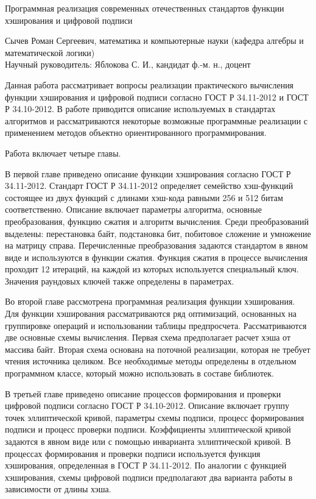 {\Large Программная реализация современных отечественных стандартов функции хэширования и цифровой подписи
\par}
{\large 
	Сычев Роман Сергеевич, математика  и компьютерные науки (кафедра алгебры и математической логики)\\
	Научный руководитель: Яблокова С. И., кандидат ф.-м. н., доцент
\par}
Данная работа рассматривает вопросы реализации практического вычисления функции хэширования и цифровой подписи согласно ГОСТ Р 34.11-2012 и ГОСТ Р 34.10-2012. В работе приводится описание используемых в стандартах алгоритмов и рассматриваются некоторые возможные программные реализации с применением методов объектно ориентированного программирования.
\par
Работа включает четыре главы. 
\par
В первой главе приведено описание функции хэширования согласно ГОСТ Р 34.11-2012. Стандарт ГОСТ Р 34.11-2012 определяет семейство хэш-функций состоящее из двух функций с длинами хэш-кода равными 256 и 512 битам соответственно. Описание включает параметры алгоритма, основные преобразования, функцию сжатия и алгоритм вычисления. Среди преобразований выделены: перестановка байт, подстановка бит, побитовое сложение и умножение на матрицу справа. Перечисленные преобразования задаются стандартом в явном виде и используются в функции сжатия. Функция сжатия в процессе вычисления проходит 12 итераций, на каждой из которых используется специальный ключ. Значения раундовых ключей также определены в параметрах.
\par
Во второй главе рассмотрена программная реализация функции хэширования. Для функции хэширования рассматриваются ряд оптимизаций, основанных на группировке операций и использовании таблицы предпросчета. Рассматриваются две основные схемы вычисления. Первая схема предполагает расчет хэша от массива байт. Вторая схема основана на поточной реализации, которая не требует чтения источника целиком. Все необходимые методы определены в отдельном программном классе, который можно использовать в составе библиотек.
\par
В третьей главе приведено описание процессов формирования и проверки цифровой подписи согласно ГОСТ Р 34.10-2012. Описание включает группу точек эллиптической кривой, параметры схемы подписи, процесс формирования подписи и процесс проверки подписи. Коэффициенты эллиптической кривой задаются в явном виде или с помощью инварианта эллиптической кривой. В процессах формирования и проверки подписи используется функция хэширования, определенная в ГОСТ Р 34.11-2012. По аналогии с функцией хэширования, схемы цифровой подписи предполагают два варианта работы в зависимости от длины хэша.
